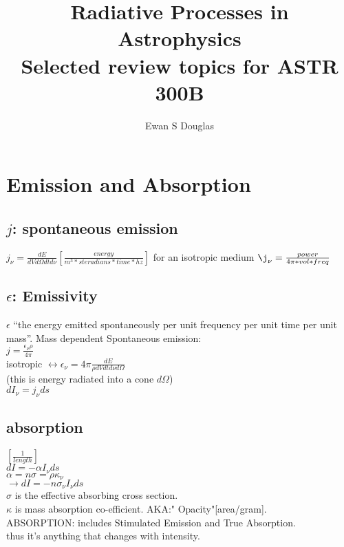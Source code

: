 \documentclass[12pt]{report}
\title{ Radiative Processes in Astrophysics\\Selected review topics for ASTR 300B}
\author{Ewan S Douglas}
\begin{document}
\maketitle

\tableofcontents


\newpage


\section{Emission and Absorption}
\subsection{$j$: spontaneous emission}

\( \boxed{j_\nu=\frac{dE}{dVd\Omega dt d\nu}} [\frac{energy}{m^3*steradians*time*hz}] \)
for an isotropic medium $\j_\nu=\frac{power}{4\pi*vol*freq}$
\subsection{$\epsilon$: Emissivity}
$\epsilon$   ``the energy emitted spontaneously per unit frequency per unit time per unit mass''.
Mass dependent Spontaneous emission: \\
$\boxed{j=\frac{\epsilon_\nu\rho}{4\pi}}$\\
 isotropic \( \leftrightarrow \epsilon_\nu=4\pi \frac{dE}{\rho dV dt d\nu d\Omega} \)\\
 (this is energy radiated into a cone $d\Omega$)\\
 \(\boxed{dI_\nu=j_\nu ds} \)
 \subsection{absorption}
 $[\frac{1}{length}]$\\
 \( dI=-\alpha I_\nu ds \) \\
 \( \boxed{\alpha=n\sigma=\rho\kappa_\nu } \) \\
 \(\rightarrow dI=-n\sigma_\nu I_\nu ds \) \\
 $\sigma$ is the effective absorbing cross section.\\
 $\kappa$ is mass absorption co-efficient. AKA:" Opacity"[area/gram].\\ 
 ABSORPTION: includes Stimulated Emission and True Absorption.\\ thus it's anything that changes with intensity.
\end{document}

